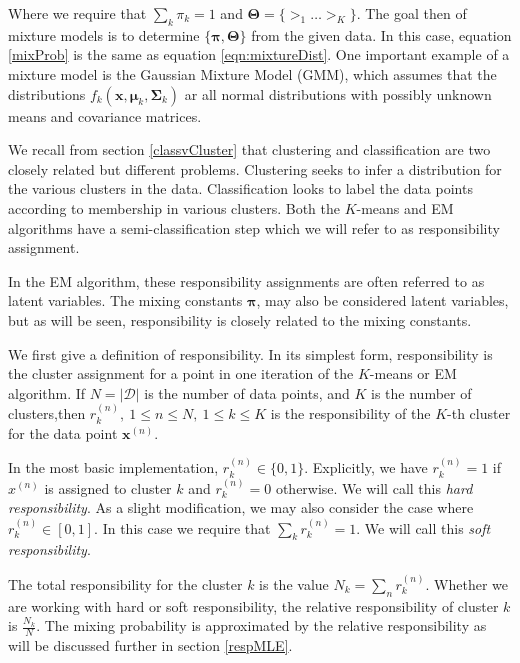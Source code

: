 Where we require that $\sum_k \pi_k =1$ and 
$\bm\Theta = \{\bm\gt_1\ldots\bm\gt_K\}$. The goal then of mixture models is 
to determine $\{\bm\pi,\bm\Theta\}$ from the given data. In this case, equation \ref{mixProb} is the same as equation \ref{eqn:mixtureDist}.  One important example of a mixture model is the Gaussian Mixture Model (GMM), which assumes that the distributions \( f_k(\bm x,\bm \mu_k,\bm \Sigma_k) \) ar all normal distributions with possibly unknown means and covariance matrices.

We recall from section \ref{classvCluster} that clustering and classification are two closely 
related but different problems. Clustering seeks to infer a distribution for 
the various clusters in the data. Classification looks to label the data 
points according to membership in various clusters. Both the $K$-means and EM 
algorithms have a semi-classification step which we will refer to as 
responsibility assignment. \cite{BishopBook,MML_2019}

In the EM algorithm, these responsibility assignments are often referred to as 
latent variables. The mixing constants $\bm\pi$, may also be considered latent 
variables, but as will be seen, responsibility is closely related to the 
mixing constants.

We first give a definition of responsibility.  In its simplest form, 
responsibility is the cluster assignment for a point in one iteration of the 
$K$-means or EM algorithm. If $N = |\mathcal{D}|$ is the number of data 
points, and  $K$ is the number of clusters,then 
$r^{(n)}_k,\ 1\leq n\leq N,\ 1\leq k\leq K$ is the responsibility of the 
$K$-th cluster for the data point $\bm x^{(n)}$.  

In the most basic implementation, $r^{(n)}_k \in \{0,1\}$. Explicitly, we have 
$r^{(n)}_k=1$ if $x^{(n)}$ is assigned to cluster $k$ and $r^{(n)}_k = 0$ 
otherwise. We will call this \textit{hard responsibility}. As a slight 
modification, we may also consider the case where $r^{(n)}_k \in [0,1]$. In 
this case we require that $\sum_k r^{(n)}_k = 1$. We will call this 
\textit{soft responsibility}.
 
The total responsibility for the cluster $k$ is the value 
$N_k = \sum_n r^{(n)}_k$.
Whether we are working with hard or soft responsibility, the relative 
responsibility of cluster $k$ is $\frac{N_k}{N}$.  The mixing probability is 
approximated by the relative responsibility as will be discussed further in 
section \ref{respMLE}.

